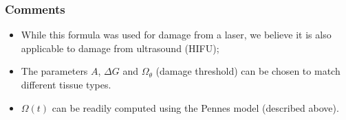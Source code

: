 \documentclass{beamer}
\begin{document}
\begin{frame}
\frametitle{Comments}
\begin{itemize}
\item While this formula was used for damage from a laser, we believe it is also applicable to damage from ultrasound (HIFU);
\item The parameters $A$, $\Delta G$ and $\Omega_\theta$ (damage threshold) can be chosen to match different tissue types.
\item $\Omega(t)$ can be readily computed using the Pennes model (described above).
\end{itemize}
 
\end{frame}
\end{document}
